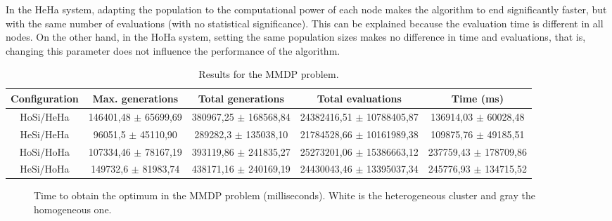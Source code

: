  In the HeHa system, adapting the population to the computational power of each node makes the algorithm to end significantly faster, but with the same number of evaluations (with no statistical significance). This can be explained because the evaluation time is different in all nodes. On the other hand, in the HoHa system, setting the same population sizes makes no difference in time and evaluations, that is, changing this parameter does not influence the performance of the algorithm. 

\begin{table*}
\centering
\caption{Results for the MMDP problem.}
\begin{tabular}{|c|c|c|c|c|} \hline
Configuration & Max. generations      & Total generations     &   Total evaluations     & Time (ms) \\ \hline
HoSi/HeHa   & 146401,48 $\pm$ 65699,69  & 380967,25 $\pm$ 168568,84 & 24382416,51 $\pm$ 10788405,87 & 136914,03 $\pm$ 60028,48\\ \hline
HeSi/HeHa   & 96051,5 $\pm$ 45110,90  & 289282,3  $\pm$ 135038,10 & 21784528,66 $\pm$ 10161989,38 & 109875,76 $\pm$ 49185,51\\ \hline \hline
HoSi/HoHa   & 107334,46 $\pm$ 78167,19  & 393119,86 $\pm$ 241835,27 & 25273201,06 $\pm$ 15386663,12 & 237759,43 $\pm$ 178709,86\\ \hline
HeSi/HoHa   & 149732,6 $\pm$ 81983,74 & 438171,16 $\pm$ 240169,19 & 24430043,46 $\pm$ 13395037,34 & 245776,93 $\pm$ 134715,52\\ \hline

\end{tabular}
\label{tab:resultsMMDP}
\end{table*}






\begin{figure}
\centering
{}
\caption{Time to obtain the optimum in the MMDP problem (milliseconds). White is the heterogeneous cluster and gray the homogeneous one.}
\label{fig:timeMMDP}
\end{figure}

